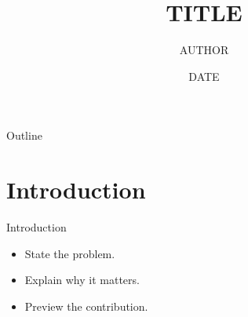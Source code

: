 \documentclass[aspectratio=169]{beamer}
\title{{{TITLE}}}
\author{{{AUTHOR}}}
\date{{{DATE}}}
\begin{document}
\begin{frame}
  \titlepage
\end{frame}

\begin{frame}{Outline}
  \tableofcontents
\end{frame}

\section{Introduction}
\begin{frame}{Introduction}
  \begin{itemize}
    \item State the problem.
    \item Explain why it matters.
    \item Preview the contribution.
  \end{itemize}
\end{frame}


\end{document}

